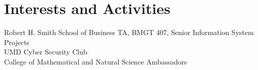 \documentclass[a4paper,11pt]{article} %
\begin{document}

\section{Interests and Activities}
Robert H. Smith School of Business TA, BMGT 407, Senior Information System Projects\\
UMD Cyber Security Club\\
College of Mathematical and Natural Science Ambassadors\\

\end{document}
